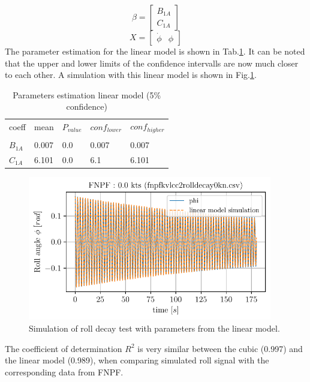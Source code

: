 \begin{equation}
\beta = \left[\begin{matrix}B_{1A}\\C_{1A}\end{matrix}\right]
\label{eq:eq_beta2}
\end{equation}
\begin{equation}
X = \left[\begin{matrix}\dot{\phi} & \phi\end{matrix}\right]
\label{eq:eq_X2}
\end{equation}
The parameter estimation for the linear model is shown in
Tab.\ref{tab:parameters2}. It can be noted that the upper and
lower limits of the confidence intervalls are now much closer to each
other. A simulation with this linear model is shown in
Fig.\ref{fig:sim_linear}.
\begin{table}[H]
\scriptsize
\center
\caption{Parameters estimation linear model (5\% confidence)}
\label{tab:parameters2}
\begin{tabular}{|l|l|l|l|l|}
\hline\addlinespace
coeff & mean & $P_{value}$ & $conf_{lower}$ & $conf_{higher}$\\
&  &  &  & \\
\hline$B_{1A}$ & 0.007 & 0.0 & 0.007 & 0.007\\
$C_{1A}$ & 6.101 & 0.0 & 6.1 & 6.101\\
\hline
\end{tabular}
\end{table}
\begin{figure}[H]
\begin{center}\includegraphics[width = 0.95\textwidth]{figures/sim_linear.pdf}\end{center}
\vspace{-0.7cm}
\caption{Simulation of roll decay test with parameters from the linear model.}
\label{fig:sim_linear}
\end{figure}
The coefficient of determination $R^2$ is very similar between the
cubic (0.997) and the linear model (0.989), when comparing simulated
roll signal with the corresponding data from FNPF.
